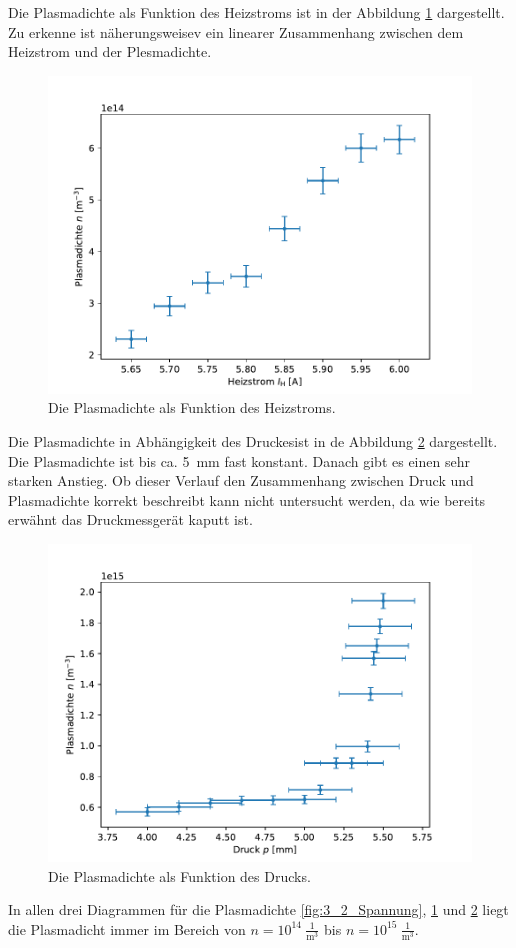 Die Plasmadichte als Funktion des Heizstroms ist in der Abbildung \ref{fig:3_2_Strom} dargestellt. Zu erkenne ist  näherungsweisev ein linearer Zusammenhang zwischen dem Heizstrom und der Plesmadichte.  
\begin{figure}[H]
\centering
\includegraphics[scale=0.6]{3_2_Strom.pdf}
\caption{Die Plasmadichte als Funktion des Heizstroms.}
\label{fig:3_2_Strom}
\end{figure}
Die Plasmadichte in Abhängigkeit des Druckesist in de Abbildung \ref{fig:3_2_Druck} dargestellt. Die Plasmadichte ist bis ca. \SI{5}{mm} fast konstant. Danach gibt es einen sehr starken Anstieg. Ob dieser Verlauf den Zusammenhang zwischen Druck und Plasmadichte korrekt beschreibt kann nicht untersucht werden, da wie bereits erwähnt das Druckmessgerät kaputt ist. 
\begin{figure}[H]
\centering
\includegraphics[scale=0.6]{3_2_Druck.pdf}
\caption{Die Plasmadichte als Funktion des Drucks.}
\label{fig:3_2_Druck}
\end{figure}
In allen drei Diagrammen für die Plasmadichte  \ref{fig:3_2_Spannung}, \ref{fig:3_2_Strom} und  \ref{fig:3_2_Druck} liegt die Plasmadicht immer im Bereich von $n=10^{14}\ \frac{1}{\mathrm{m}^3}$ bis  $n=10^{15}\ \frac{1}{\mathrm{m}^3}$.
